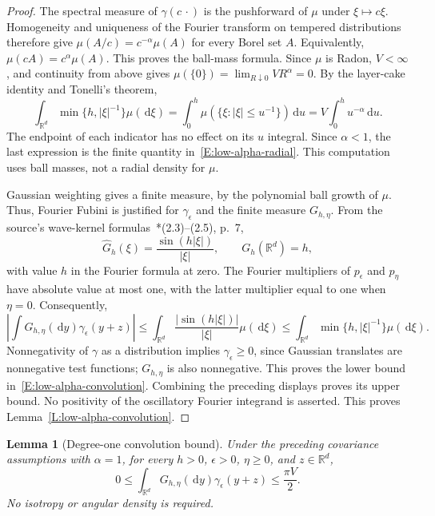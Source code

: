 \documentclass[12pt]{article}
\numberwithin{equation}{section}
\newtheorem{lemma}[theorem]{Lemma}
\theoremstyle{definition}
\newcommand{\R}{\mathbb{R}}
\newcommand{\ud}{\,\mathrm{d}}
\begin{document}
\begin{proof}
  The spectral measure of $\gamma(c\,\cdot)$ is the pushforward of
  $\mu$ under $\xi\mapsto c\xi$. Homogeneity and
  uniqueness of the Fourier transform on tempered distributions
  therefore give $\mu(A/c)=c^{-\alpha}\mu(A)$ for every Borel set $A$.
  Equivalently, $\mu(cA)=c^\alpha\mu(A)$. This proves the ball-mass
  formula. Since $\mu$ is Radon, $V<\infty$, and continuity from above
  gives $\mu(\{0\})=\lim_{R\downarrow0}VR^\alpha=0$.
  By the layer-cake identity and Tonelli's theorem,
  \[
    \int_{\R^d}\min\{h,|\xi|^{-1}\}\mu(\ud\xi)
    =\int_0^h\mu(\{\xi:|\xi|\le u^{-1}\})\ud u
    =V\int_0^h u^{-\alpha}\ud u.
  \]
  The endpoint of each indicator has no effect on its $u$ integral.
  Since $\alpha<1$, the last expression is the finite quantity
  in~\eqref{E:low-alpha-radial}. This computation uses ball masses,
  not a radial density for $\mu$.

  Gaussian weighting gives a finite measure, by the polynomial ball
  growth of $\mu$. Thus, Fourier Fubini is justified for $\gamma_\epsilon$
  and the finite measure $G_{h,\eta}$. From the source's wave-kernel
  formulas~\cite{chen:author2026:time-dependency}*{(2.3)--(2.5), p.~7},
  \[
    \widehat G_h(\xi)=\frac{\sin(h|\xi|)}{|\xi|},\qquad
    G_h(\R^d)=h,
  \]
  with value $h$ in the Fourier formula at zero. The Fourier multipliers
  of $p_\epsilon$ and $p_\eta$ have absolute value at most one, with
  the latter multiplier equal to one when $\eta=0$. Consequently,
  \[
    \left|\int G_{h,\eta}(\ud y)\gamma_\epsilon(y+z)\right|
    \le\int_{\R^d}\frac{|\sin(h|\xi|)|}{|\xi|}\mu(\ud\xi)
    \le\int_{\R^d}\min\{h,|\xi|^{-1}\}\mu(\ud\xi).
  \]
  Nonnegativity of $\gamma$ as a distribution implies
  $\gamma_\epsilon\ge0$, since Gaussian translates are nonnegative
  test functions; $G_{h,\eta}$ is also nonnegative. This proves the
  lower bound in~\eqref{E:low-alpha-convolution}. Combining the
  preceding displays proves its upper bound. No positivity of the
  oscillatory Fourier integrand is asserted. This proves
  Lemma~\ref{L:low-alpha-convolution}.
\end{proof}

\begin{lemma}[Degree-one convolution bound]\label{L:alpha-one-convolution}
  Under the preceding covariance assumptions with $\alpha=1$, for
  every $h>0$, $\epsilon>0$, $\eta\ge0$, and $z\in\R^d$,
  \begin{equation}\label{E:alpha-one-convolution}
    0\le\int_{\R^d}G_{h,\eta}(\ud y)\gamma_\epsilon(y+z)
    \le\frac{\pi V}{2}.
  \end{equation}
  No isotropy or angular density is required.
\end{lemma}
\end{document}
